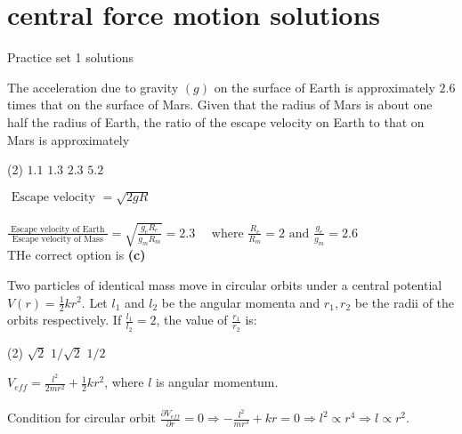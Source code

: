 \chapter{central force motion solutions}
\begin{abox}
	Practice set 1 solutions
	\end{abox}
\begin{enumerate}
	\begin{minipage}{\textwidth}
		\item The acceleration due to gravity $(g)$ on the surface of Earth is approximately $2.6$ times that on the surface of Mars. Given that the radius of Mars is about one half the radius of Earth, the ratio of the escape velocity on Earth to that on Mars is approximately
	\end{minipage}
	\begin{tasks}(2)
		\task[\textbf{A.}] $1.1$
		\task[\textbf{B.}]$1.3$
		\task[\textbf{C.}]$2.3$
		\task[\textbf{D.}]$5.2$
	\end{tasks}
\begin{answer}
	$\text { Escape velocity }=\sqrt{2 g R}$\\\\
	$\frac{\text { Escape velocity of Earth }}{\text { Escape velocity of Mass }}=\sqrt{\frac{g_{e} R_{e}}{g_{m} R_{m}}}=2.3 \quad \text { where } \frac{R_{e}}{R_{m}}=2 \text { and } \frac{g_{e}}{g_{m}}=2.6$\\
	THe correct option is \textbf{(c)}
\end{answer}
\begin{minipage}{\textwidth}
	\item Two particles of identical mass move in circular orbits under a central potential $V(r)=\frac{1}{2} k r^{2}$. Let $l_{1}$ and $l_{2}$ be the angular momenta and $r_{1}, r_{2}$ be the radii of the orbits respectively. If $\frac{l_{1}}{l_{2}}=2$, the value of $\frac{r_{1}}{r_{2}}$ is:
\end{minipage}
\begin{tasks}(2)
	\task[\textbf{A.}] $\sqrt{2}$
	\task[\textbf{B.}]$1 / \sqrt{2}$
	\task[\textbf{D.}] $1 / 2$
\end{tasks}
\begin{answer}
	 $V_{e f f}=\frac{l^{2}}{2 m r^{2}}+\frac{1}{2} k r^{2}$, where $l$ is angular momentum.\\\\
	Condition for circular orbit $\frac{\partial V_{e f f}}{\partial r}=0 \Rightarrow-\frac{l^{2}}{m r^{3}}+k r=0 \Rightarrow l^{2} \propto r^{4} \Rightarrow l \propto r^{2}$.\\

\end{answer}
\end{enumerate}
